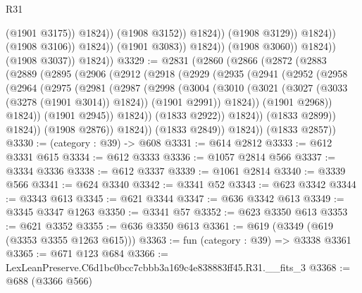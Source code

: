 \begin{lexlean}{R31}
\begin{coremodule}
                                              (@1901 @3175))
                                            @1824))
                                        (@1908 @3152))
                                      @1824))
                                  (@1908 @3129))
                                @1824))
                            (@1908 @3106))
                          @1824))
                      (@1901 @3083))
                    @1824))
                (@1908 @3060))
              @1824))
          (@1908 @3037))
        @1824))
@3329 := @2831
    (@2860
      (@2866
        (@2872
          (@2883
            (@2889
              (@2895
                (@2906
                  (@2912
                    (@2918
                      (@2929
                        (@2935
                          (@2941
                            (@2952
                              (@2958
                                (@2964
                                  (@2975
                                    (@2981
                                      (@2987
                                        (@2998
                                          (@3004
                                            (@3010
                                              (@3021
                                                (@3027 (@3033 (@3278 (@1901 @3014)) @1824))
                                                (@1901 @2991))
                                              @1824))
                                          (@1901 @2968))
                                        @1824))
                                    (@1901 @2945))
                                  @1824))
                              (@1833 @2922))
                            @1824))
                        (@1833 @2899))
                      @1824))
                  (@1908 @2876))
                @1824))
            (@1833 @2849))
          @1824))
      (@1833 @2857))
@3330 := (category : @39) -> @608
@3331 := @614 @2812
@3333 := @612 @3331 @615
@3334 := @612 @3333
@3336 := @1057 @2814 @566
@3337 := @3334 @3336
@3338 := @612 @3337
@3339 := @1061 @2814
@3340 := @3339 @566
@3341 := @624 @3340
@3342 := @3341 @52
@3343 := @623 @3342
@3344 := @3343 @613
@3345 := @621 @3344
@3347 := @636 @3342 @613
@3349 := @3345 @3347 @1263
@3350 := @3341 @57
@3352 := @623 @3350 @613
@3353 := @621 @3352
@3355 := @636 @3350 @613
@3361 := @619 (@3349 (@619 (@3353 @3355 @1263 @615)))
@3363 := fun (category : @39) => @3338 @3361
@3365 := @671 @123 @684
@3366 := LexLeanPreserve.C6d1bc0bcc7cbbb3a169c4e838883ff45.R31.__fits_3
@3368 := @688 (@3366 @566)

\end{coremodule}
\end{lexlean}
